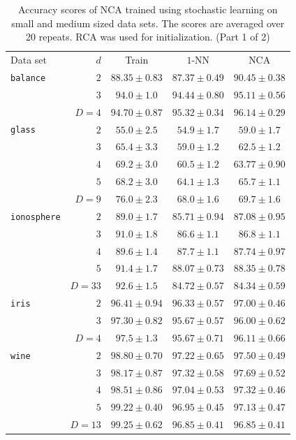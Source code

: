 \begin{table}
  \centering\begin{tabular}{lrccc}
	    \toprule
            	Data set & $d$ & Train & $1$-NN & NCA \\
            \cmidrule(r){3-3}\cmidrule(r){4-5}
             \texttt{balance}&$2$&$88.35 \pm 0.83$&$87.37 \pm 0.49$&$90.45 \pm 0.38$\\ 
&$3$&$94.0 \pm 1.0$&$94.44 \pm 0.80$&$95.11 \pm 0.56$\\ 
&$D=4$&$94.70 \pm 0.87$&$95.32 \pm 0.34$&$96.14 \pm 0.29$\\ 
\midrule
\texttt{glass}&$2$&$55.0 \pm 2.5$&$54.9 \pm 1.7$&$59.0 \pm 1.7$\\ 
&$3$&$65.4 \pm 3.3$&$59.0 \pm 1.2$&$62.5 \pm 1.2$\\ 
&$4$&$69.2 \pm 3.0$&$60.5 \pm 1.2$&$63.77 \pm 0.90$\\ 
&$5$&$68.2 \pm 3.0$&$64.1 \pm 1.3$&$65.7 \pm 1.1$\\ 
&$D=9$&$76.0 \pm 2.3$&$68.0 \pm 1.6$&$69.7 \pm 1.6$\\ 
\midrule
\texttt{ionosphere}&$2$&$89.0 \pm 1.7$&$85.71 \pm 0.94$&$87.08 \pm 0.95$\\ 
&$3$&$91.0 \pm 1.8$&$86.6 \pm 1.1$&$86.8 \pm 1.1$\\ 
&$4$&$89.6 \pm 1.4$&$87.7 \pm 1.1$&$87.74 \pm 0.97$\\ 
&$5$&$91.4 \pm 1.7$&$88.07 \pm 0.73$&$88.35 \pm 0.78$\\ 
&$D=33$&$92.6 \pm 1.5$&$84.72 \pm 0.57$&$84.34 \pm 0.59$\\ 
\midrule
\texttt{iris}&$2$&$96.41 \pm 0.94$&$96.33 \pm 0.57$&$97.00 \pm 0.46$\\ 
&$3$&$97.30 \pm 0.82$&$95.67 \pm 0.57$&$96.00 \pm 0.62$\\ 
&$D=4$&$97.5 \pm 1.3$&$95.67 \pm 0.71$&$96.11 \pm 0.66$\\ 
\midrule
\texttt{wine}&$2$&$98.80 \pm 0.70$&$97.22 \pm 0.65$&$97.50 \pm 0.49$\\ 
&$3$&$98.17 \pm 0.87$&$97.32 \pm 0.58$&$97.69 \pm 0.52$\\ 
&$4$&$98.51 \pm 0.86$&$97.04 \pm 0.53$&$97.32 \pm 0.46$\\ 
&$5$&$99.22 \pm 0.40$&$96.95 \pm 0.45$&$97.13 \pm 0.47$\\ 
&$D=13$&$99.25 \pm 0.62$&$96.85 \pm 0.41$&$96.85 \pm 0.41$\\ 
\bottomrule
     \end{tabular}
     \caption[Accuracy for NCA trained using stochastic learning on small and medium sized data sets (part 1 of 2)]{Accuracy scores of NCA trained using stochastic learning on small and medium sized data sets. The scores are averaged over 20 repeats. RCA was used for initialization. (Part 1 of 2)}
     \label{app:table:nca-sl-small-1}
\end{table}

